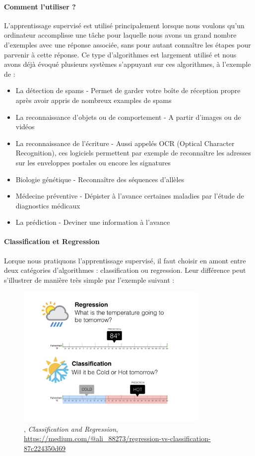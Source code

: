 \paragraph{Comment l'utiliser ?} L'apprentissage supervisé est utilisé principalement lorsque nous voulons qu'un ordinateur accomplisse une tâche pour laquelle nous avons un grand nombre
d'exemples avec une réponse associée, sans pour autant connaître les étapes pour parvenir à cette réponse. Ce type d'algorithmes est largement utilisé et nous avons déjà évoqué plusieurs
systèmes s'appuyant sur ces algorithmes, à l'exemple de :
\begin{itemize}
    \item La détection de spams - Permet de garder votre boîte de réception propre après avoir appris de nombreux examples de spams
    \item La reconnaissance d'objets ou de comportement - A partir d'images ou de vidéos
    \item La reconnaissance de l'écriture - Aussi appelés OCR (Optical Character Recognition), ces logiciels permettent par exemple de reconnaître les adresses sur les
    enveloppes postales ou encore les signatures
    \item Biologie génétique - Reconnaître des séquences d'allèles
    \item Médecine préventive - Dépister à l'avance certaines maladies par l'étude de diagnostics médicaux
    \item La prédiction - Deviner une information à l'avance \cite{Internet7}
\end{itemize}

\paragraph{Classification et Regression} Lorque nous pratiquons l'apprentissage supervisé, il faut choisir en amont entre deux catégories d'algorithmes : classification ou
regression. Leur différence peut s'illustrer de manière très simple par l'exemple suivant :

\begin{figure}[h]
    \centering
    \includegraphics[width=350px]{chapters/03/images/classification-regression.jpg}
    \caption{\label{supervised learning}, \emph{Classification and Regression}, \url{https://medium.com/@ali_88273/regression-vs-classification-87c224350d69}}
\end{figure}

